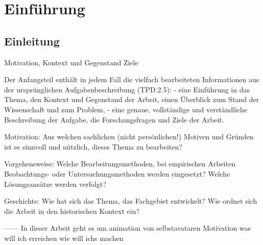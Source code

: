 \chapter{Einführung}

\section{Einleitung}
Motivation, Kontext und Gegenstand
Ziele

Der Anfangsteil enthält in jedem Fall die vielfach bearbeiteten Informationen aus der
ursprünglichen Aufgabenbeschreibung (TPD.2.5):
- eine Einführung in das Thema, den Kontext und Gegenstand der Arbeit, einen
Überblick zum Stand der Wissenschaft und zum Problem,
- eine genaue, vollständige und verständliche Beschreibung der Aufgabe, die Forschungsfragen und Ziele der Arbeit.

Motivation: Aus welchen sachlichen (nicht persönlichen!) Motiven und Gründen ist es
sinnvoll und nützlich, dieses Thema zu bearbeiten?

Vorgehensweise: Welche Bearbeitungsmethoden, bei empirischen Arbeiten Beobachtungs- oder Untersuchungsmethoden werden eingesetzt? Welche Lösungsansätze werden verfolgt?

Geschichte: Wie hat sich das Thema, das Fachgebiet entwickelt? Wie ordnet sich die
Arbeit in den historischen Kontext ein?

------
In dieser Arbeit geht es um animation von selbstavataren
Motivation
was will ich erreichen
wie will ichs machen
